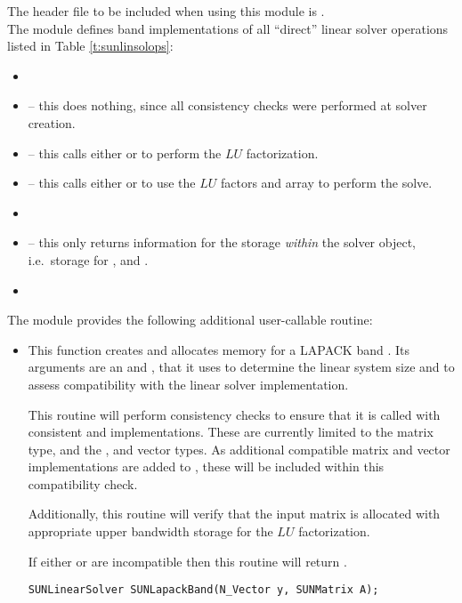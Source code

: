 \noindent The header file to be included when using this module 
is . \\
The {\sunlinsollapband} module defines band implementations of all
``direct'' linear solver operations listed in
Table \ref{t:sunlinsolops}:
\begin{itemize}
\item {}
\item {} -- this does nothing, since all
  consistency checks were performed at solver creation.
\item {} -- this calls either
   or  to perform the $LU$ factorization.
\item {} -- this calls either
   or  to use the $LU$ factors and 
  array to perform the solve.
\item {}
\item {} -- this only returns information for
  the storage \emph{within} the solver object, i.e.~storage
  for ,  and .
\item {}
\end{itemize}
The module {\sunlinsollapband} provides the following additional
user-callable routine: 
\begin{itemize}


\item {}

  This function creates and allocates memory for a LAPACK band
  .  Its arguments are an {\nvector} and
  {\sunmatrix}, that it uses to determine the linear system size and
  to assess compatibility with the linear solver implementation.

  This routine will perform consistency checks to ensure that it is
  called with consistent {\nvector} and {\sunmatrix} implementations.
  These are currently limited to the {\sunmatband} matrix type, and
  the {\nvecs}, {\nvecopenmp} and {\nvecpthreads} vector types.  As
  additional compatible matrix and vector implementations are added to
  {\sundials}, these will be included within this compatibility check.

  Additionally, this routine will verify that the input matrix 
  is allocated with appropriate upper bandwidth storage for the $LU$
  factorization.

  If either  or  are incompatible then this routine will
  return .

  \verb|SUNLinearSolver SUNLapackBand(N_Vector y, SUNMatrix A);|

\end{itemize}
